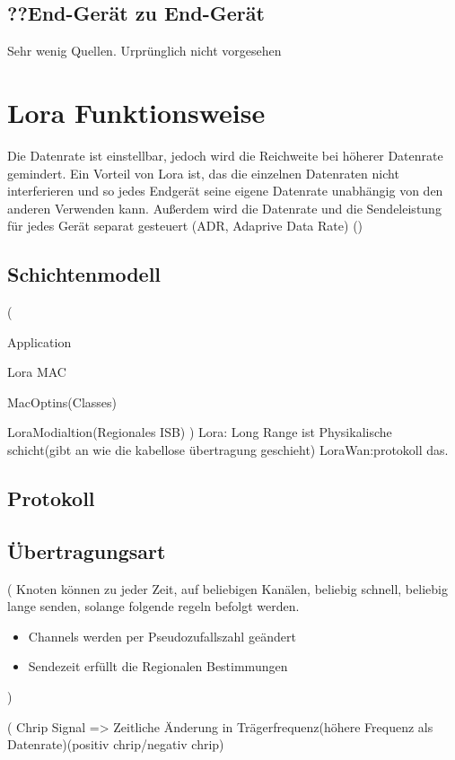 \documentclass[a4paper,12pt]{article}
\begin{document}
    \subsection{??End-Gerät zu End-Gerät}
    Sehr wenig Quellen. Urprünglich nicht vorgesehen
    \section{Lora Funktionsweise}
    Die Datenrate ist einstellbar, jedoch wird die Reichweite bei höherer Datenrate gemindert. Ein Vorteil von Lora ist, das die einzelnen Datenraten nicht interferieren und so jedes Endgerät seine eigene Datenrate unabhängig von den anderen Verwenden kann.
    Außerdem wird die Datenrate und die Sendeleistung für jedes Gerät separat gesteuert (ADR, Adaprive Data Rate)
        \cite{RFC8376}
        \cite{LoRaSpec}
        \cite{WhatIsLoRa}()
    \subsection{Schichtenmodell}

    \cite{WhatIsLoRa}(

    Application

    Lora MAC

    MacOptins(Classes)

    LoraModialtion(Regionales ISB)
    )
    Lora: Long Range ist Physikalische schicht(gibt an wie die kabellose übertragung geschieht)
    LoraWan:protokoll das.
    \subsection{Protokoll}
    \subsection{Übertragungsart}
    \cite{LoRaSpec}(
        Knoten können zu jeder Zeit, auf beliebigen Kanälen, beliebig schnell, beliebig lange senden, solange folgende regeln befolgt werden.
        \begin{itemize}
            
                \item Channels werden per Pseudozufallszahl geändert
                \item Sendezeit erfüllt die Regionalen Bestimmungen
            
        \end{itemize}
    )

    \cite{LoraLimit}(
        Chrip Signal => Zeitliche Änderung in Trägerfrequenz(höhere Frequenz als Datenrate)(positiv chrip/negativ chrip)
\end{document}
